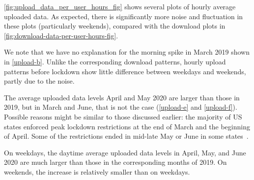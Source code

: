 \cref{fig:upload_data_per_user_hours_fig} shows several plots of hourly average uploaded data. As expected, there is significantly more noise and fluctuation in these plots (particularly weekends), compared with the download plots in \cref{fig:download-data-per-user-hours-fig}.

We note that we have no explanation for the morning spike in March 2019 shown in \cref{upload-b}. Unlike the corresponding download patterns, hourly upload patterns before lockdown show little difference between weekdays and weekends, partly due to the noise.

 The average uploaded data levels April and May 2020 are larger than those in 2019, but in March and June, that is not the case (\cref{upload-e} and \cref{upload-f}). Possible reasons might be similar to those discussed earlier: the majority of \gls{US} states enforced peak lockdown restrictions at the end of March and the beginning of April. Some of the restrictions ended in mid-late May or June in some states~\cite{covid19restriction}.

 On weekdays, the daytime average uploaded data levels in April, May, and June 2020 are much larger than those in the corresponding months of 2019. On weekends, the increase is relatively smaller than on weekdays.